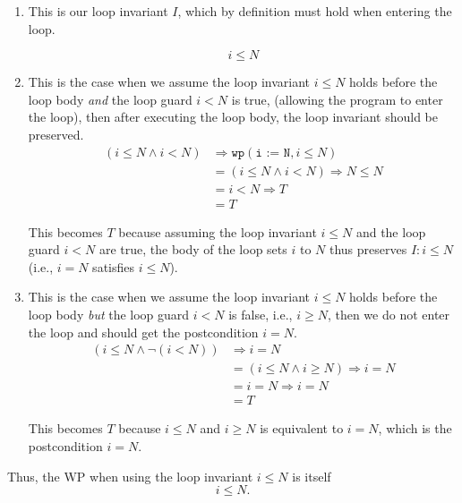 \documentclass[oneside,11pt,dvipsnames]{book}
\renewcommand{\implies}{\Rightarrow}
\newcommand{\code}[1]{\texttt{#1}}
\begin{document}
\begin{enumerate}
    \item         This is our loop invariant $I$, which by definition must hold when entering the loop.

        \[i \le N\]

    \item This is the case when we assume the loop invariant $i \le N$ holds before the loop body \emph{and} the loop guard $i < N$ is true, (allowing the program to enter the loop), then after executing the loop body, the loop invariant should be preserved.
    \begin{equation*}
        \begin{split}
            (i \le N \land  i < N) &\implies \code{wp}(\code{i := N}, i \le N)\\
            &= (i \le N \land  i < N) \implies  N \le N\\
            &= i < N \implies  T\\
            &= T
        \end{split}
    \end{equation*}

    This becomes $T$ because assuming the loop invariant $i \le N$ and the loop guard $i < N$ are true, the body of the loop sets $i$ to $N$ thus preserves $I: i \le N$ (i.e., $i = N$ satisfies $i \le N$).

    \item  This is the case when we assume the loop invariant $i \le N$ holds before the loop body  \emph{but} the loop guard $i < N$ is false, i.e., $i \ge N$, then we do not enter the loop and should get the postcondition $i = N$.
    \begin{equation*}
        \begin{split}
            (i \le N \land \neg(i < N)) &\implies i = N\\
            &= (i \le N  \land i \ge N)  \implies i = N\\
            &=     i = N   \implies  i = N\\
            &=          T
        \end{split}
    \end{equation*}

    This becomes $T$ because $i \le N$ and $i \ge N$ is equivalent to $i = N$, which is the postcondition $i = N$.

\end{enumerate}

Thus, the WP when using the loop invariant $i \le N$ is itself 
\[ i \le N .\] 
\end{document}
